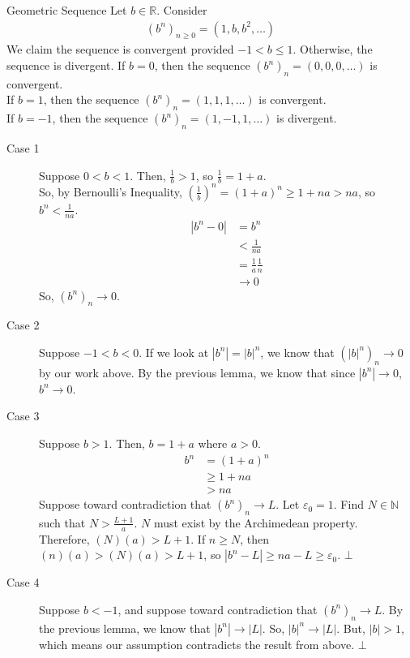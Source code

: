 \documentclass[8pt]{extarticle}
\newcommand{\N}{\mathbb{N}}
\newcommand{\R}{\mathbb{R}}
\begin{document}
  \begin{problem}{Geometric Sequence}
    Let $b\in\R$. Consider
    \begin{align*}
      \left(b^n\right)_{n\geq 0} = (1,b,b^2,\dots)
    \end{align*}
    We claim the sequence is convergent provided $-1 < b \leq 1$. Otherwise, the sequence is divergent.
    \tcblower
    If $b = 0$, then the sequence $(b^n)_{n} = (0,0,0,\dots)$ is convergent.\\

    If $b = 1$, then the sequence $(b^n)_n = (1,1,1,\dots)$ is convergent.\\

    If $b = -1$, then the sequence $(b^n)_n = (1,-1,1,\dots)$ is divergent.
    \begin{description}
      \item[Case 1] Suppose $0 < b < 1$. Then, $\frac{1}{b}> 1$, so $\frac{1}{b} = 1+a$.\\

        So, by Bernoulli's Inequality, $\left(\frac{1}{b}\right)^n = \left(1+a\right)^n \geq 1 + na > na$, so $b^n < \frac{1}{na}$.
        \begin{align*}
          |b^n-0| &= b^n\\
                  &< \frac{1}{na}\\
                  &= \frac{1}{a}\frac{1}{n}\\
                  &\rightarrow 0
        \end{align*}
        So, $\left(b^n\right)_n \rightarrow 0$.
      \item[Case 2] Suppose $-1 < b < 0$. If we look at $|b^n| = |b|^n$, we know that $\left(|b|^n\right)_n \rightarrow 0$ by our work above. By the previous lemma, we know that since $|b^n|\rightarrow 0$, $b^n \rightarrow 0$.
      \item[Case 3] Suppose $b > 1$. Then, $b = 1 + a$ where $a > 0$.
        \begin{align*}
          b^n &= (1+a)^n\\
              &\geq 1 + na \tag*{Bernoulli's Inequality}\\
              &> na
        \end{align*}
        Suppose toward contradiction that $\left(b^n\right)_n \rightarrow L$. Let $\varepsilon_0 = 1$. Find $N\in \N$ such that $N > \frac{L + 1}{a}$. $N$ must exist by the Archimedean property.\\

        Therefore, $(N)(a) > L+1$. If $n\geq N$, then $(n)(a) > (N)(a) > L+1$, so $|b^n - L| \geq na - L \geq \varepsilon_0$. $\bot$
      \item[Case 4] Suppose $b < -1$, and suppose toward contradiction that $(b^n)_n \rightarrow L$. By the previous lemma, we know that $|b^n| \rightarrow |L|$. So, $|b|^n \rightarrow |L|$. But, $|b| > 1$, which means our assumption contradicts the result from above. $\bot$
    \end{description}
  \end{problem}
\end{document}
